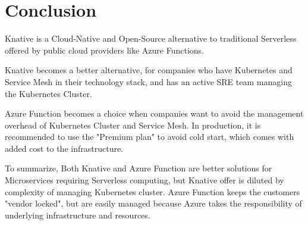 \documentclass{article}
\begin{document}
\section*{Conclusion}
\begin{flushleft}
Knative is a Cloud-Native and Open-Source alternative to traditional Serverless offered by public cloud providers like Azure Functions.
\par
Knative becomes a better alternative, for companies who have Kubernetes and Service Mesh in their technology stack, and has an active \gls{SRE} team managing the Kubernetes Cluster. 
\par
Azure Function becomes a choice when companies want to avoid the management overhead of Kubernetes Cluster and Service Mesh. In production, it is recommended to use the "Premium plan" to avoid cold start, which comes with added cost to the infrastructure. 
\par
To summarize, Both Knative and Azure Function are better solutions for Microservices requiring Serverless computing, but Knative offer is diluted by complexity of managing Kubernetes cluster. Azure Function keeps the customers "vendor locked", but are easily managed because Azure takes the responsibility of underlying infrastructure and resources.

\end{flushleft}

\pagebreak

\printbibliography
\clearpage
\printglossary
\end{document}

